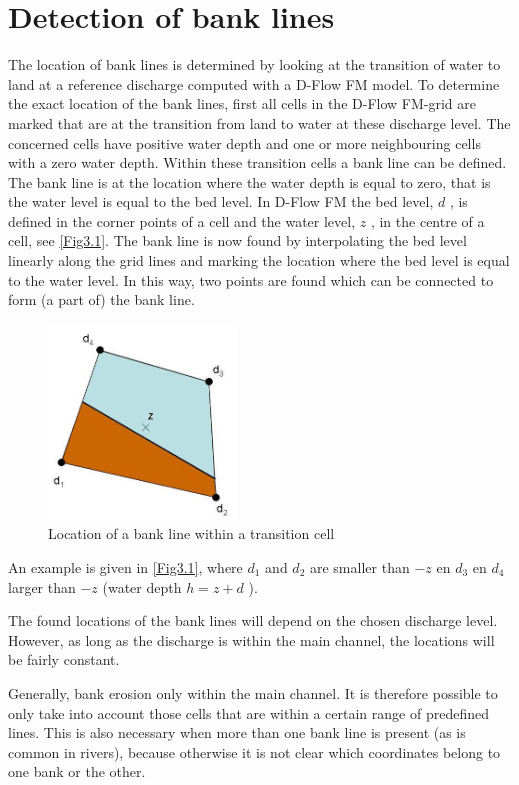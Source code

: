 \chapter{Detection of bank lines} \label{Chp3}

The location of bank lines is determined by looking at the transition of water to land at a reference discharge computed with a D-Flow FM model.
To determine the exact location of the bank lines, first all cells in the D-Flow FM-grid are marked that are at the transition from land to water at these discharge level.
The concerned cells have positive water depth and one or more neighbouring cells with a zero water depth.
Within these transition cells a bank line can be defined.
The bank line is at the location where the water depth is equal to zero, that is the water level is equal to the bed level.
In D-Flow FM the bed level, $d$ , is defined in the corner points of a cell and the water level, $z$ , in the centre of a cell, see \autoref{Fig3.1}.
The bank line is now found by interpolating the bed level linearly along the grid lines and marking the location where the bed level is equal to the water level.
In this way, two points are found which can be connected to form (a part of) the bank line.

\begin{figure}
\includegraphics[width=5cm]{figures/Fig3-1.png}
\caption{Location of a bank line within a transition cell}
\label{Fig3.1}
\end{figure}

An example is given in \autoref{Fig3.1}, where $d_1$ and $d_2$ are smaller than $-z$ en $d_3$ en $d_4$ larger than $-z$ (water depth $h = z+d$ ).

The found locations of the bank lines will depend on the chosen discharge level.
However, as long as the discharge is within the main channel, the locations will be fairly constant.

Generally, bank erosion only within the main channel.
It is therefore possible to only take into account those cells that are within a certain range of predefined lines.
This is also necessary when more than one bank line is present (as is common in rivers), because otherwise it is not clear which coordinates belong to one bank or the other.

